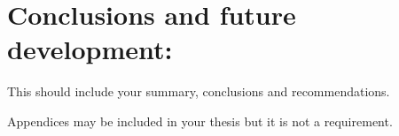 \documentclass[a4paper,12pt]{article}
\begin{document}




%
%
%
%
%






%


\clearpage
\section{Conclusions and future development: }

{This should include your summary, conclusions and recommendations. }

\newpage

\medskip



\clearpage
\newpage

\begin{appendices}

{Appendices may be included in your thesis but it is not a requirement.}

\end{appendices}
\end{document}
